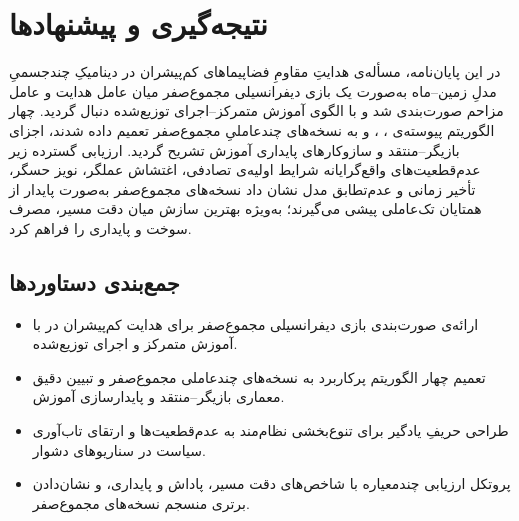 
\chapter{نتیجه‌گیری و پیشنهادها}
\label{chap:conclusion}

\noindent
در این پایان‌نامه، مسأله‌ی هدایتِ مقاومِ فضاپیماهای کم‌پیشران در دینامیکِ چندجسمیِ مدلِ  زمین–ماه به‌صورت یک {بازی دیفرانسیلی مجموع‌صفر} میان عامل هدایت و عامل مزاحم صورت‌بندی شد و با الگوی {آموزش متمرکز–اجرای توزیع‌شده} دنبال گردید. چهار الگوریتم پیوسته‌ی ، ،  و  به نسخه‌های چندعاملیِ مجموع‌صفر تعمیم داده شدند، اجزای بازیگر–منتقد و سازوکارهای پایداری آموزش تشریح گردید. ارزیابی گسترده زیر عدم‌قطعیت‌های واقع‌گرایانه شرایط اولیه‌ی تصادفی، اغتشاش عملگر، نویز حسگر، تأخیر زمانی و عدم‌تطابق مدل نشان داد نسخه‌های مجموع‌صفر به‌صورت پایدار از همتایان تک‌عاملی پیشی می‌گیرند؛ به‌ویژه  بهترین سازش میان دقت مسیر، مصرف سوخت و پایداری را فراهم کرد.

\section{جمع‌بندی دستاوردها}
\begin{itemize}
  \item ارائه‌ی صورت‌بندی بازی دیفرانسیلی مجموع‌صفر برای هدایت کم‌پیشران در  با آموزش متمرکز و اجرای توزیع‌شده.
  \item تعمیم چهار الگوریتم پرکاربرد  به نسخه‌های چندعاملی مجموع‌صفر و تبیین دقیق معماری بازیگر–منتقد و پایدارسازی آموزش.
  \item طراحی حریفِ یادگیر برای تنوع‌بخشی نظام‌مند به عدم‌قطعیت‌ها و ارتقای تاب‌آوری سیاست در سناریوهای دشوار.
  \item پروتکل ارزیابی چندمعیاره با شاخص‌های دقت مسیر، پاداش 
  و پایداری، و نشان‌دادن برتری
   منسجم نسخه‌های مجموع‌صفر.
\end{itemize}

